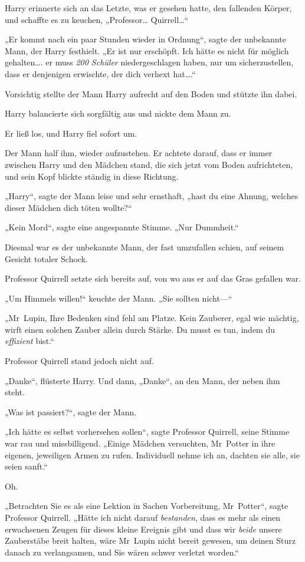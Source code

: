{Harry erinnerte sich an das Letzte, was er gesehen hatte, den fallenden Körper, und schaffte es zu keuchen, „Professor… Quirrell…“

„Er kommt nach ein paar Stunden wieder in Ordnung“, sagte der unbekannte Mann, der Harry festhielt. „Er ist nur erschöpft. Ich hätte es nicht für möglich gehalten…. er muss \emph{200 Schüler} niedergeschlagen haben, nur um sicherzustellen, dass er denjenigen erwischte, der dich verhext hat….“

Vorsichtig stellte der Mann Harry aufrecht auf den Boden und stützte ihn dabei.

Harry balancierte sich sorgfältig aus und nickte dem Mann zu.

Er ließ los, und Harry fiel sofort um.

Der Mann half ihm, wieder aufzustehen. Er achtete darauf, dass er immer zwischen Harry und den Mädchen stand, die sich jetzt vom Boden aufrichteten, und sein Kopf blickte ständig in diese Richtung.

„Harry“, sagte der Mann leise und sehr ernsthaft, „hast du eine Ahnung, welches dieser Mädchen dich töten wollte?“

„Kein Mord“, sagte eine angespannte Stimme. „Nur Dummheit.“

Diesmal war es der unbekannte Mann, der fast umzufallen schien, auf seinem Gesicht totaler Schock.

Professor Quirrell setzte sich bereits auf, von wo aus er auf das Gras gefallen war.

„Um Himmels willen!“ keuchte der Mann. „Sie sollten nicht—“

„Mr~Lupin, Ihre Bedenken sind fehl am Platze. Kein Zauberer, egal wie mächtig, wirft einen solchen Zauber allein durch Stärke. Du musst es tun, indem du \emph{effizient} bist.“

Professor Quirrell stand jedoch nicht auf.

„Danke“, flüsterte Harry. Und dann, „Danke“, an den Mann, der neben ihm steht.

„Was ist passiert?“, sagte der Mann.

„Ich hätte es selbst vorhersehen sollen“, sagte Professor Quirrell, seine Stimme war rau und missbilligend. „Einige Mädchen versuchten, Mr~Potter in ihre eigenen, jeweiligen Armen zu rufen. Individuell nehme ich an, dachten sie alle, sie seien sanft.“

Oh.

„Betrachten Sie es als eine Lektion in Sachen Vorbereitung, Mr~Potter“, sagte Professor Quirrell. „Hätte ich nicht darauf \emph{bestanden}, dass es mehr als einen erwachsenen Zeugen für dieses kleine Ereignis gibt und dass wir \emph{beide} unsere Zauberstäbe breit halten, wäre Mr~Lupin nicht bereit gewesen, um deinen Sturz danach zu verlangsamen, und Sie wären schwer verletzt worden.“

}
